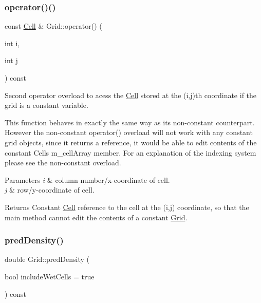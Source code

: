 \subsubsection{\texorpdfstring{operator()()}{operator()()}\hspace{0.1cm}{\footnotesize\ttfamily [2/2]}}
{\footnotesize\ttfamily const \hyperlink{class_cell}{Cell} \& Grid\+::operator() (\begin{DoxyParamCaption}\item[{int}]{i,  }\item[{int}]{j }\end{DoxyParamCaption}) const}



Second operator overload to acess the \hyperlink{class_cell}{Cell} stored at the (i,j)th coordinate if the grid is a constant variable. 

This function behaves in exactly the same way as its non-\/constant counterpart. However the non-\/constant operator() overload will not work with any constant grid objects, since it returns a reference, it would be able to edit contents of the constant Cells m\+\_\+cell\+Array member. For an explanation of the indexing system please see the non-\/constant overload.


\begin{DoxyParams}{Parameters}
{\em i} & column number/x-\/coordinate of cell. \\
\hline
{\em j} & row/y-\/coordinate of cell.\\
\hline
\end{DoxyParams}
\begin{DoxyReturn}{Returns}
Constant \hyperlink{class_cell}{Cell} reference to the cell at the (i,j) coordinate, so that the main method cannot edit the contents of a constant \hyperlink{class_grid}{Grid}. 
\end{DoxyReturn}
\mbox{\label{class_grid_a25eeb1fef1d86fe74b45e615f0376158}} 
\subsubsection{\texorpdfstring{pred\+Density()}{predDensity()}}
{\footnotesize\ttfamily double Grid\+::pred\+Density (\begin{DoxyParamCaption}\item[{bool}]{include\+Wet\+Cells = {\ttfamily true} }\end{DoxyParamCaption}) const}



